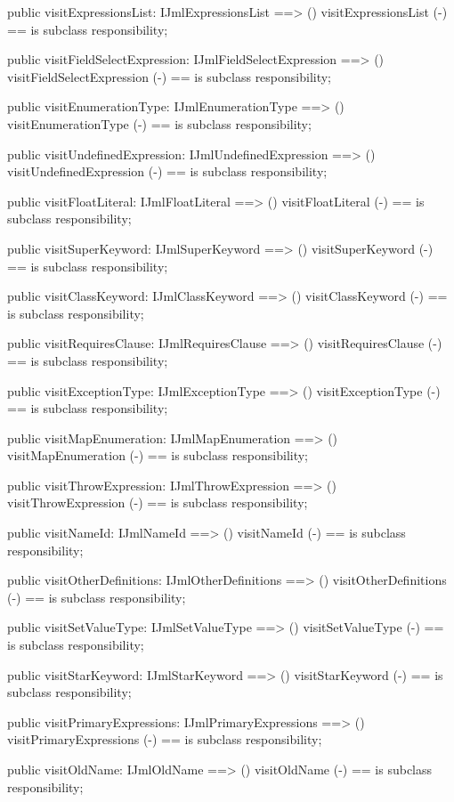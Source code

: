 \begin{vdm_al}
  public visitExpressionsList: IJmlExpressionsList ==> ()
  visitExpressionsList (-) == is subclass responsibility;

  public visitFieldSelectExpression: IJmlFieldSelectExpression ==> ()
  visitFieldSelectExpression (-) == is subclass responsibility;

  public visitEnumerationType: IJmlEnumerationType ==> ()
  visitEnumerationType (-) == is subclass responsibility;

  public visitUndefinedExpression: IJmlUndefinedExpression ==> ()
  visitUndefinedExpression (-) == is subclass responsibility;

  public visitFloatLiteral: IJmlFloatLiteral ==> ()
  visitFloatLiteral (-) == is subclass responsibility;

  public visitSuperKeyword: IJmlSuperKeyword ==> ()
  visitSuperKeyword (-) == is subclass responsibility;

  public visitClassKeyword: IJmlClassKeyword ==> ()
  visitClassKeyword (-) == is subclass responsibility;

  public visitRequiresClause: IJmlRequiresClause ==> ()
  visitRequiresClause (-) == is subclass responsibility;

  public visitExceptionType: IJmlExceptionType ==> ()
  visitExceptionType (-) == is subclass responsibility;

  public visitMapEnumeration: IJmlMapEnumeration ==> ()
  visitMapEnumeration (-) == is subclass responsibility;

  public visitThrowExpression: IJmlThrowExpression ==> ()
  visitThrowExpression (-) == is subclass responsibility;

  public visitNameId: IJmlNameId ==> ()
  visitNameId (-) == is subclass responsibility;

  public visitOtherDefinitions: IJmlOtherDefinitions ==> ()
  visitOtherDefinitions (-) == is subclass responsibility;

  public visitSetValueType: IJmlSetValueType ==> ()
  visitSetValueType (-) == is subclass responsibility;

  public visitStarKeyword: IJmlStarKeyword ==> ()
  visitStarKeyword (-) == is subclass responsibility;

  public visitPrimaryExpressions: IJmlPrimaryExpressions ==> ()
  visitPrimaryExpressions (-) == is subclass responsibility;

  public visitOldName: IJmlOldName ==> ()
  visitOldName (-) == is subclass responsibility;


\end{vdm_al}
